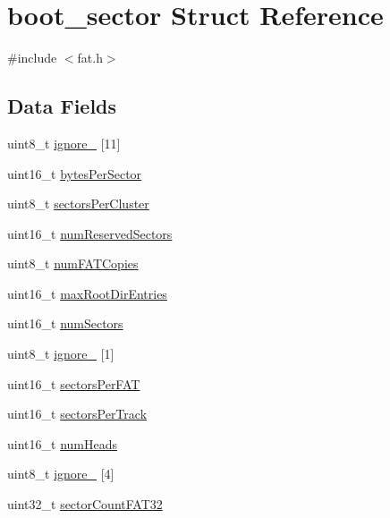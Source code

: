 \hypertarget{structboot__sector}{}\section{boot\+\_\+sector Struct Reference}
\label{structboot__sector}


{\ttfamily \#include $<$fat.\+h$>$}

\subsection*{Data Fields}
\begin{DoxyCompactItemize}
\item 
uint8\+\_\+t \hyperlink{structboot__sector_a4a5f044c4af1ec63539b4d313aabb92a}{ignore\+\_} \mbox{[}11\mbox{]}
\item 
uint16\+\_\+t \hyperlink{structboot__sector_adb2ddeae74baf681103d21d724814a63}{bytes\+Per\+Sector}
\item 
uint8\+\_\+t \hyperlink{structboot__sector_a3ce07376c286acd8393a18a32d7ca4c0}{sectors\+Per\+Cluster}
\item 
uint16\+\_\+t \hyperlink{structboot__sector_a9837d510dc3b5f71fffea972a5ddcca4}{num\+Reserved\+Sectors}
\item 
uint8\+\_\+t \hyperlink{structboot__sector_a248319edc283c2789351510caa983680}{num\+F\+A\+T\+Copies}
\item 
uint16\+\_\+t \hyperlink{structboot__sector_ab233d94ef0ebef743305b206a1fad236}{max\+Root\+Dir\+Entries}
\item 
uint16\+\_\+t \hyperlink{structboot__sector_a089c1fc6d861771cad3c35c875e7b6d9}{num\+Sectors}
\item 
uint8\+\_\+t \hyperlink{structboot__sector_a0b21e9d53cf987278e208805bc8500c8}{ignore\+\_} \mbox{[}1\mbox{]}
\item 
uint16\+\_\+t \hyperlink{structboot__sector_a863410095bdf8e95fa196716be36d91b}{sectors\+Per\+F\+AT}
\item 
uint16\+\_\+t \hyperlink{structboot__sector_a42886f9109ee1759d5972e871f0689a8}{sectors\+Per\+Track}
\item 
uint16\+\_\+t \hyperlink{structboot__sector_a59a74774238113cb621818427f11a877}{num\+Heads}
\item 
uint8\+\_\+t \hyperlink{structboot__sector_a7b56f8c85b389a72d0885f574f2d2161}{ignore\+\_} \mbox{[}4\mbox{]}
\item 
uint32\+\_\+t \hyperlink{structboot__sector_a381d6892c473adfd2847a08ed022d81c}{sector\+Count\+F\+A\+T32}

\end{DoxyCompactItemize}
